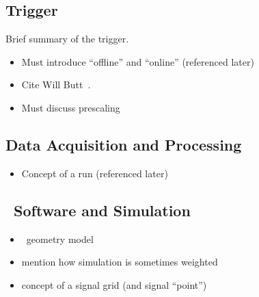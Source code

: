 \subsection{Trigger}
\label{sec:trigger}
Brief summary of the trigger.
\begin{itemize}
\item Must introduce ``offline'' and ``online'' (referenced later)
\item Cite Will Butt~\cite{atlas-lvl1}.
\item Must discuss prescaling
\end{itemize}
\subsection{Data Acquisition and Processing}
\begin{itemize}
\item Concept of a run (referenced later)
\end{itemize}
\subsection{\atlas\ Software and Simulation}
\label{sec:software}
\begin{itemize}
\item \atlas\ geometry model
\item mention how simulation is sometimes weighted
\item concept of a signal grid (and signal ``point'')
\end{itemize}
